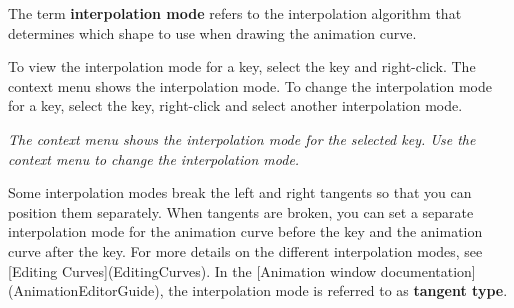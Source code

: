 The term {\bfseries{interpolation mode}} refers to the interpolation algorithm that determines which shape to use when drawing the animation curve.

To view the interpolation mode for a key, select the key and right-\/click. The context menu shows the interpolation mode. To change the interpolation mode for a key, select the key, right-\/click and select another interpolation mode.



{\itshape The context menu shows the interpolation mode for the selected key. Use the context menu to change the interpolation mode.}

Some interpolation modes break the left and right tangents so that you can position them separately. When tangents are broken, you can set a separate interpolation mode for the animation curve before the key and the animation curve after the key. For more details on the different interpolation modes, see \mbox{[}Editing Curves\mbox{]}(Editing\+Curves). In the \mbox{[}Animation window documentation\mbox{]}(Animation\+Editor\+Guide), the interpolation mode is referred to as {\bfseries{tangent type}}. 